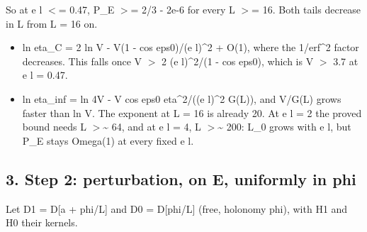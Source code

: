 \documentclass[11pt,a4paper]{article}
\begin{document}
So at e l $<$= 0.47, P\_E $>$= 2/3 - 2e-6 for every L $>$= 16. Both tails decrease in L from L = 16 on.

\begin{itemize}
\item{} ln eta\_C = 2 ln V - V(1 - cos eps0)/(e l)\textasciicircum{}2 + O(1), where the 1/erf\textasciicircum{}2 factor decreases. This falls once
V $>$ 2 (e l)\textasciicircum{}2/(1 - cos eps0), which is V $>$ 3.7 at e l = 0.47.
\item{} ln eta\_inf = ln 4V - V cos eps0 eta\textasciicircum{}2/((e l)\textasciicircum{}2 G(L)), and V/G(L) grows faster than ln V. The exponent at L = 16 is
already 20. At e l = 2 the proved bound needs L $>$\textasciitilde{} 64, and at e l = 4,
L $>$\textasciitilde{} 200: L\_0 grows with e l, but P\_E stays Omega(1) at every fixed e l.
\end{itemize}


\subsection*{3. Step 2: perturbation, on E, uniformly in phi}
Let D1 = D[a + phi/L] and D0 = D[phi/L] (free, holonomy phi), with H1 and H0 their kernels.
\end{document}
